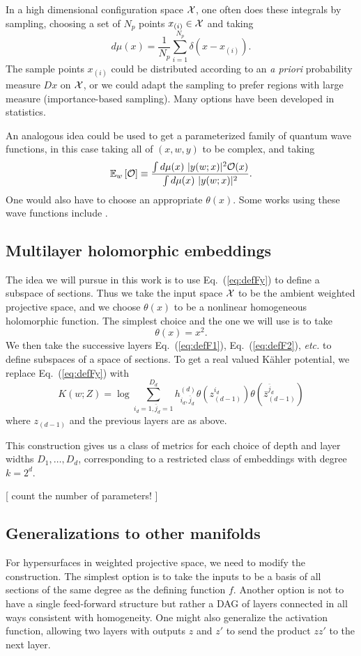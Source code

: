 \documentclass[12pt]{article}
\def\E#1#2{\mathbb{E}_{#1}\left[#2\right]}
\def\CO {{\cal O}}
\def\CX {{\cal X}}
\newcommand{\eq}[1]{Eq.~(\ref{eq:#1})}
\newcommand{\be}{\begin{equation}}
\newcommand{\ee}{\end{equation}}
\def\bz{\bar{z}}
\def\bj{{\bar{j}}}
\def\bz{\bar{z}}
\begin{document}
In a high dimensional configuration space $\CX$, one often does these integrals by sampling,
choosing a set of $N_p$ points $x_{(i)}\in\CX$ and taking
\be
d\mu(x) = \frac{1}{N_p} \sum_{i=1}^{N_p} \delta(x-x_{(i)}) .
\ee
The sample points $x_{(i)}$ could be distributed 
according to an {\it a priori} probability measure $Dx$ on $\CX$, or we could
adapt the sampling to prefer regions with large measure (importance-based sampling).  Many options have been
developed in statistics.

An analogous idea could be used to get a parameterized family of quantum
wave functions, in this case taking all of $(x,w,y)$ to be complex, and taking
\be
\E{w}{\CO} \equiv \frac{ \int d\mu(x)\ |y(w;x)|^2 \CO(x) }{ \int d\mu(x)\ |y(w;x)|^2 } .
\ee
One would also have to choose an
appropriate $\theta(x)$.   Some works using these wave functions include \cite{}.

\subsection{ Multilayer holomorphic embeddings }

The idea we will pursue in this work is to use \eq{defFy} to define a subspace of sections.
Thus we take the input space $\CX$ to be the ambient weighted projective space, and we choose
$\theta(x)$ to be a nonlinear homogeneous holomorphic function.  
The simplest choice and the one we will use is to take
\be \label{eq:deftheta}
\theta(x) = x^2 .
\ee
We then take the successive layers \eq{defF1}, \eq{defF2}, {\it etc.} to define subspaces of a space of
sections. 
To get a real valued K\"ahler potential, we replace \eq{defFy} with
\be \label{eq:defFK}
K(w;Z) =  \log\sum_{i_d=1,\bj_d=1}^{D_d} h^{(d)}_{i_d,\bj_d} \theta( z_{(d-1)}^{i_d} ) \theta( \bz_{(d-1)}^{\bj_d} ) 
\ee
where $z_{(d-1)}$ and the previous layers are as above.

This construction gives us a class of metrics for each choice of depth and layer widths $D_1,\ldots,D_d$,
corresponding to a restricted class of embeddings with degree  $k=2^d$.

[ count the number of parameters! ]

\subsection{ Generalizations to other manifolds }

For hypersurfaces in weighted projective space, we need to modify the construction.
The simplest option is to take the inputs to be a basis of all sections of the same degree as the
defining function $f$.  Another option is not to have a single feed-forward structure but rather
a DAG of layers connected in all ways consistent with homogeneity.  One might also generalize
the activation function, allowing two layers with outputs $z$ and $z'$ to send the product $zz'$
to the next layer.
\end{document}
